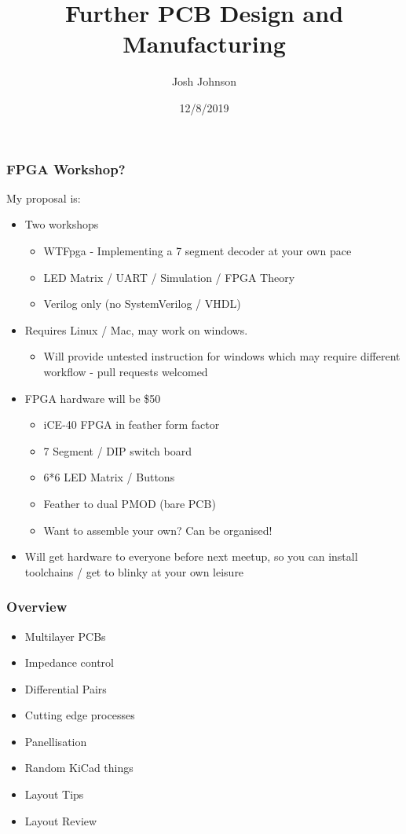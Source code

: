 \documentclass[t]{beamer}
\title[furtherPCB]{Further PCB Design and Manufacturing} %
\author{Josh Johnson} %
\institute[] %
{ \\ %
\medskip
\textit{} %
}
\date{12/8/2019} %
\begin{document}
\begin{frame}
\titlepage %
\end{frame}



\begin{frame}
\frametitle{FPGA Workshop?}
My proposal is:
\begin{itemize}
	\item Two workshops
	\begin{itemize}
		\item WTFpga - Implementing a 7 segment decoder at your own pace
		\item LED Matrix / UART / Simulation / FPGA Theory
		\item Verilog only (no SystemVerilog / VHDL)
	\end{itemize}
	\item Requires Linux / Mac, may work on windows.
	\begin{itemize}
		\item Will provide untested instruction for windows which may require different workflow - pull requests welcomed 
	\end{itemize}
	\item FPGA hardware will be \$50
	\begin{itemize}
		\item iCE-40 FPGA in feather form factor
		\item 7 Segment / DIP switch board
		\item 6*6 LED Matrix / Buttons
		\item Feather to dual PMOD (bare PCB)
		\item Want to assemble your own? Can be organised!
	\end{itemize}
	\item Will get hardware to everyone before next meetup, so you can install toolchains / get to blinky at your own leisure 
\end{itemize}
\end{frame}
\begin{frame}
\frametitle{Overview}
\begin{itemize}
	\item Multilayer PCBs
	\item Impedance control
	\item Differential Pairs
	\item Cutting edge processes
	\item Panellisation
	\item Random KiCad things
	\item Layout Tips
	\item Layout Review
\end{itemize}
\end{frame}
\end{document}
